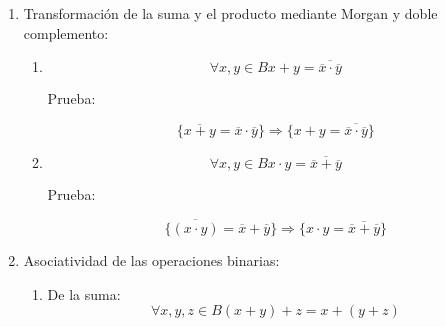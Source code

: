 \begin{enumerate}
\begin{enumerate}
\begin{enumerate}
\begin{enumerate}
        \[{{{{{({x + y})} + {({\overline{x} \cdot \overline{y}})}} = {{({x + {({\overline{x} \cdot \overline{y}})}})} \cdot {({y + {({\overline{x} \cdot \overline{y}})}})}}} = {{({x + {({\overline{x} \cdot \overline{y}})}})} \cdot {({y + {({\overline{y} \cdot \overline{x}})}})}}} = {1 + 1}} = 1\]
      \item
        \[\forall x,{y \in B}{\overline{x\cdot y} = {\overline{x} + \overline{y}}}\]

        Prueba:

        \[{{{{{({x \cdot y})} + {({\overline{x} + \overline{y}})}} = {{({x + {({\overline{x} + \overline{y}})}})} \cdot {({y + {({\overline{x} + \overline{y}})}})}}} = {{({x + {({\overline{x} + \overline{y}})}})} \cdot {({y + {({\overline{y} + \overline{x}})}})}}} = {1 \cdot 1}} = 1\]

        \[{{{{{({x \cdot y})} \cdot {({\overline{x} + \overline{y}})}} = {{({x \cdot {({\overline{x} + \overline{y}})}})} + {({y \cdot {({\overline{x} + \overline{y}})}})}}} = {{({x \cdot {({\overline{x} + \overline{y}})}})} + {({y \cdot {({\overline{y} + \overline{x}})}})}}} = {0 \cdot 0}} = 0\]
      \end{enumerate}
    \item
      Transformación de la suma y el producto mediante Morgan y doble
      complemento:

      \begin{enumerate}
      \def\labelenumiv{\arabic{enumiv}.}
      \item
        \[\forall x,{y \in B}{{x + y} = \overline{\overline{x}\cdot\overline{y}}}\]

        Prueba:

        \[{\{{\overline{x+y} = {\overline{x} \cdot \overline{y}}}\}}\Rightarrow{\{{{x + y} = \overline{\overline{x}\cdot\overline{y}}}\}}\]
      \item
        \[\forall x,{y \in B}{{x \cdot y} = \overline{\overline{x}+\overline{y}}}\]

        Prueba:

        \[{\{{\overline{({x\cdot y})} = {\overline{x} + \overline{y}}}\}}\Rightarrow{\{{{x \cdot y} = \overline{\overline{x}+\overline{y}}}\}}\]
      \end{enumerate}
    \item
      Asociatividad de las operaciones binarias:

      \begin{enumerate}
      \def\labelenumiv{\arabic{enumiv}.}
      \item
        De la suma:
        \[\forall x,y,{z \in B}{{{({x + y})} + z} = {x + {({y + z})}}}\]


\end{enumerate}
\end{enumerate}
\end{enumerate}
\end{enumerate}
